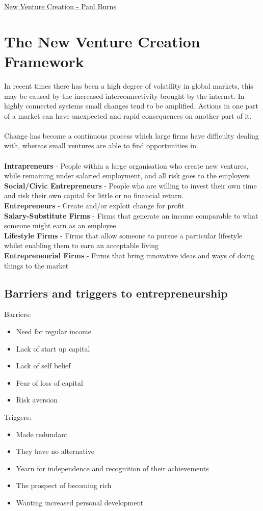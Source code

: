 \documentclass{article}[18pt]
\begin{document}
\begin{center}
\underline{\huge New Venture Creation - Paul Burns}
\end{center}
\section{The New Venture Creation Framework}
In recent times there has been a high degree of volatility in global markets, this may be caused by the increased interconnectivity brought by the internet. In highly connected systems small changes tend to be amplified. Actions in one part of a market can have unexpected and rapid consequences on another part of it.\\
\\
Change has become a continuous process which large firms have difficulty dealing with, whereas small ventures are able to find opportunities in.\\
\\
\textbf{Intrapreneurs} - People within a large organisation who create new ventures, while remaining under salaried employment, and all risk goes to the employers\\
\textbf{Social/Civic Entrepreneurs} - People who are willing to invest their own time and risk their own capital for little or no financial return.\\
\textbf{Entrepreneurs} - Create and/or exploit change for profit\\
\textbf{Salary-Substitute Firms} - Firms that generate an income comparable to what someone might earn as an employee\\
\textbf{Lifestyle Firms} - Firms that allow someone to pursue a particular lifestyle whilst enabling them to earn an acceptable living\\
\textbf{Entrepreneurial Firms} - Firms that bring innovative ideas and ways of doing things to the market
\subsection{Barriers and triggers to entrepreneurship}
Barriers:
\begin{itemize}
\item Need for regular income
\item Lack of start up capital
\item Lack of self belief
\item Fear of loss of capital
\item Risk aversion
\end{itemize}
Triggers:
\begin{itemize}
\item Made redundant
\item They have no alternative
\item Yearn for independence and recognition of their achievements
\item The prospect of becoming rich
\item Wanting increased personal development
\end{itemize}
\end{document}
